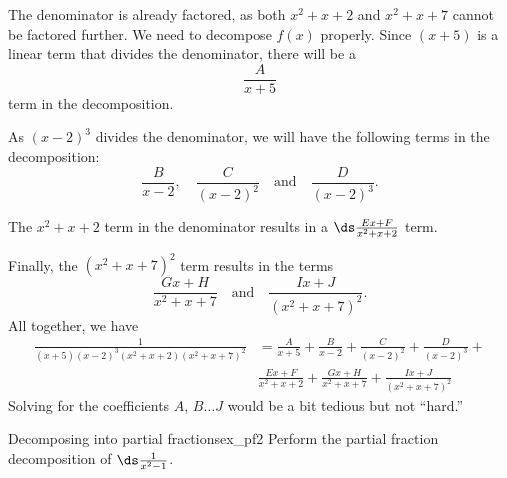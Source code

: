 \begin{solution}
{The denominator is already factored, as both $x^2+x+2$ and $x^2+x+7$ cannot be factored further. We need to decompose $f(x)$ properly. Since $(x+5)$ is a linear term that divides the denominator, there will be a $$\frac{A}{x+5}$$ term in the decomposition.

As $(x-2)^3$ divides the denominator, we will have the following terms in the decomposition:
$$\frac{B}{x-2},\quad \frac{C}{(x-2)^2}\quad \text{and}\quad \frac{D}{(x-2)^3}.$$

The $x^2+x+2$ term in the denominator results in a $\ds\frac{Ex+F}{x^2+x+2}$ term.

Finally, the $(x^2+x+7)^2$ term results in the terms $$\frac{Gx+H}{x^2+x+7}\quad \text{and}\quad \frac{Ix+J}{(x^2+x+7)^2}.$$
All together, we have 
\begin{align*}
\frac{1}{(x+5)(x-2)^3(x^2+x+2)(x^2+x+7)^2} &= \frac{A}{x+5} + \frac{B}{x-2}+ \frac{C}{(x-2)^2}+\frac{D}{(x-2)^3}+ \\
		& \frac{Ex+F}{x^2+x+2}+\frac{Gx+H}{x^2+x+7}+\frac{Ix+J}{(x^2+x+7)^2}
\end{align*}
Solving for the coefficients $A$, $B \ldots J$ would be a bit tedious but not ``hard.''
}
\end{solution}








\begin{example}{Decomposing into partial fractions}{ex_pf2}
{
Perform the partial fraction decomposition of $\ds \frac{1}{x^2-1}$.
}
\end{example}


